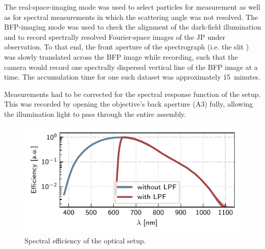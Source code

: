 \documentclass[10pt]{article}
\begin{document}



The real-space-imaging mode was used to select particles for measurement as well as for spectral measurements in which the scattering angle was not resolved. 
The BFP-imaging mode was used to check the alignment of the dark-field illumination and to record spectrally resolved Fourier-space images of the JP under observation. 
To that end, the front aperture of the spectrograph (i.e. the slit {}) was slowly translated across the BFP image while recording, such that the camera would record one spectrally dispersed vertical line of the BFP image at a time. 
The accumulation time for one such dataset was approximately \mbox{15 minutes}. 

Measurements had to be corrected for the spectral response function of the setup. 
This was recorded by opening the objective's back aperture {\sffamily(A3)} fully, allowing the illumination light to pass through the entire assembly. 

\begin{figure}[h]
    \centering
    \includegraphics[width=\columnwidth]{corrections-log}
    \caption{Spectral efficiency of the optical setup.}
    \label{fig:corrections}
\end{figure}
\end{document}
